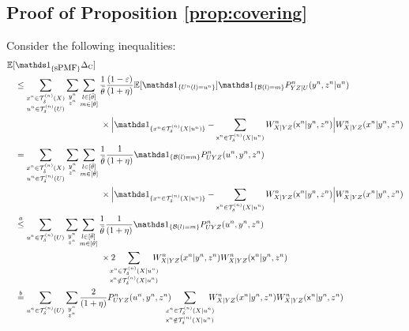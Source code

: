 \subsection{Proof of Proposition \ref{prop:covering}}
\label{app:proof:prop:covering}
Consider the following inequalities:
    \begin{align*}
         \EE[&\Ipmf \ce] \\
         &\leq \sum_{\substack{\xn \in \Tx \\ \un \in \Tu }} \sum_{\substack{\yn \\ \zn}} \sum_{\substack{ l \in [\btheta]\\m\in [\theta] }} 
    \frac{1}{\btheta} \frac{(1-\varepsilon)}{(1+\eta)} 
    \EE[\I_{\set{\Un(l) = \un}}] \I_{\set{\calB(l) = m}} P_{YZ|U}^n(\yn,\zn|\un) \\
    & \hspace{100pt} \times \Big|\I_{\set{\xn \in \Txcond}} - \sum_{\substack{\sfxn \in \Txcond}} W^n_{X|YZ}(\sfxn
    |\yn,\zn)
    \Big|W^n_{X|YZ}(\xn|\yn,\zn)\\
    &= \sum_{\substack{\xn \in \Tx \\ \un \in \Tu }} \sum_{\substack{\yn \\ \zn}} \sum_{\substack{ l \in [\btheta]\\m\in [\theta] }} 
    \frac{1}{\btheta} \frac{1}{(1+\eta)} 
    \I_{\set{\calB(l) = m}} P_{UYZ}^n(\un,\yn,\zn) \\
    & \hspace{100pt} \times \Big|\I_{\set{\xn \in \Txcond}} - \sum_{\substack{\sfxn \in \Txcond}} W^n_{X|YZ}(\sfxn
    |\yn,\zn)
    \Big|W^n_{X|YZ}(\xn|\yn,\zn)\\
    & \overset{a}{\leq} \sum_{\substack{\un \in \Tu }} \sum_{\substack{\yn \\ \zn}} \sum_{\substack{ l \in [\btheta]\\m\in [\theta] }} 
    \frac{1}{\btheta} \frac{1}{(1+\eta)} 
    \I_{\set{\calB(l) = m}} P_{UYZ}^n(\un,\yn,\zn) \\
    &\hspace{100pt}\times 2  \!\!\!\!\! \sum_{\substack{\xn \in \Txcond \\ \sfxn \notin \Txcond}} \!\!\!\!\!W^n_{X|YZ}(\xn|\yn,\zn)W^n_{X|YZ}(\sfxn|\yn,\zn)\\
    &\overset{b}{=}\sum_{\substack{\un \in \Tu \\}} \sum_{\substack{\yn \\ \zn}} 
\frac{2}{(1+\eta)}  P_{UYZ}^n(\un,\yn,\zn)  \!\!\!\!\!\sum_{\substack{\xn \in \Txcond \\ \sfxn \notin \Txcond}}\!\!\!\!\! W^n_{X|YZ}(\xn|\yn,\zn)W^n_{X|YZ}(\sfxn|\yn,\zn)\\

\end{align*}
